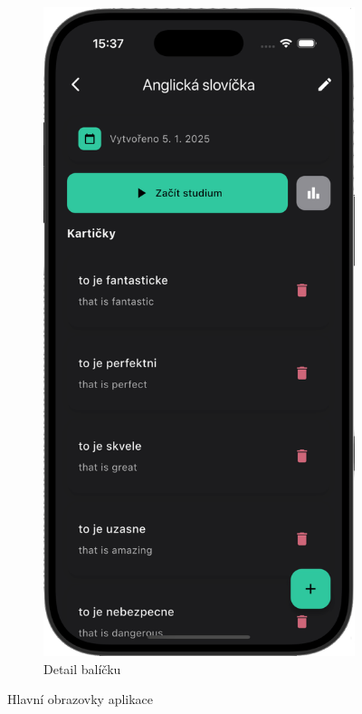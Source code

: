 \documentclass[12pt, a4paper, oneside]{report}
\begin{document}
\begin{figure}[h]
\begin{subfigure}[b]{0.48\textwidth}
			\includegraphics[width=0.75\linewidth]{../image/screen-deck-detail.png}
			\caption{Detail balíčku}
			\label{fig:screen-detail}
		\end{subfigure}
		\caption{Hlavní obrazovky aplikace}
		\label{fig:screens}
	\end{figure}
\end{document}
